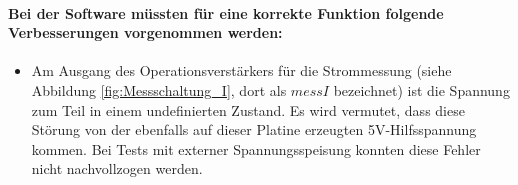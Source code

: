 \paragraph{Bei der Software müssten für eine korrekte Funktion folgende Verbesserungen vorgenommen werden:}
\begin{itemize}
	\item Am Ausgang des Operationsverstärkers für die Strommessung (siehe Abbildung \ref{fig:Messschaltung_I}, dort als $messI$ bezeichnet) ist die Spannung zum Teil in einem undefinierten Zustand. Es wird vermutet, dass diese Störung von der ebenfalls auf dieser Platine erzeugten 5V-Hilfsspannung kommen. Bei Tests mit externer Spannungsspeisung konnten diese Fehler nicht nachvollzogen werden.
\end{itemize}